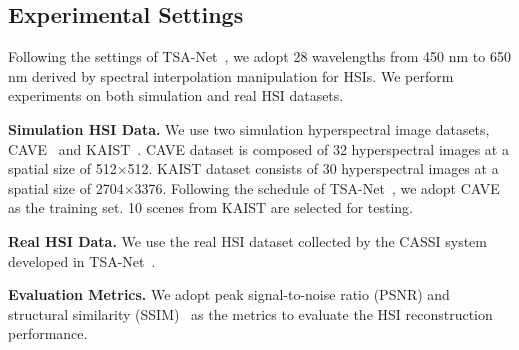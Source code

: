 \documentclass[10pt,twocolumn,letterpaper]{article}
\begin{document}
\subsection{Experimental Settings}
\vspace{-0.5mm}
Following the settings of TSA-Net~\cite{tsa_net}, we adopt 28 wavelengths from 450 nm to 650 nm derived by spectral interpolation manipulation for HSIs. We perform experiments on both simulation and real HSI datasets.


\noindent \textbf{Simulation HSI Data.} We use two simulation hyperspectral image datasets, CAVE~\cite{cave} and KAIST~\cite{kaist}. CAVE dataset is composed of 32 hyperspectral images at a spatial size of 512$\times$512. KAIST dataset consists of 30 hyperspectral images at a spatial size of 2704$\times$3376. Following  the schedule of  TSA-Net~\cite{tsa_net}, we adopt CAVE as the training set. 10 scenes from KAIST are  selected for testing. 

\noindent \textbf{Real HSI Data.} We use the real HSI dataset   collected by the CASSI system developed in TSA-Net~\cite{tsa_net}.

\noindent \textbf{Evaluation Metrics.} We adopt peak signal-to-noise ratio (PSNR) and structural similarity (SSIM)~\cite{ssim} as the metrics to evaluate the HSI  reconstruction performance.
\end{document}
